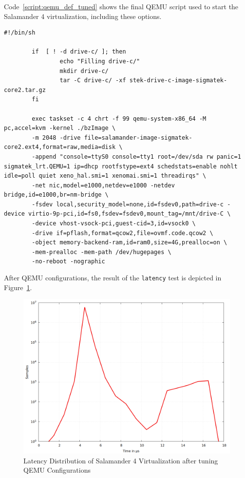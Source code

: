 \documentclass[MMR,Master,english]{twbook}
\begin{document}
\noindent Code~\ref{script:qemu_def_tuned} shows the final QEMU script used to start the Salamander 4 virtualization, including these options.

\clearpage

\begin{lstlisting}[name={Tuned QEMU Script for starting Salamander 4 Virtualization},label={script:qemu_def_tuned}]
		#!/bin/sh

		if  [ ! -d drive-c/ ]; then
				echo "Filling drive-c/"
				mkdir drive-c/
				tar -C drive-c/ -xf stek-drive-c-image-sigmatek-core2.tar.gz
		fi
			
		exec taskset -c 4 chrt -f 99 qemu-system-x86_64 -M pc,accel=kvm -kernel ./bzImage \
		-m 2048 -drive file=salamander-image-sigmatek-core2.ext4,format=raw,media=disk \
		-append "console=ttyS0 console=tty1 root=/dev/sda rw panic=1 sigmatek_lrt.QEMU=1 ip=dhcp rootfstype=ext4 schedstats=enable nohlt idle=poll quiet xeno_hal.smi=1 xenomai.smi=1 threadirqs" \
		-net nic,model=e1000,netdev=e1000 -netdev bridge,id=e1000,br=nm-bridge \
		-fsdev local,security_model=none,id=fsdev0,path=drive-c -device virtio-9p-pci,id=fs0,fsdev=fsdev0,mount_tag=/mnt/drive-C \
		-device vhost-vsock-pci,guest-cid=3,id=vsock0 \
		-drive if=pflash,format=qcow2,file=ovmf.code.qcow2 \
		-object memory-backend-ram,id=ram0,size=4G,prealloc=on \
		-mem-prealloc -mem-path /dev/hugepages \
		-no-reboot -nographic
	\end{lstlisting}
\vspace{2em}
\noindent After QEMU configurations, the result of the \texttt{latency} test is depicted in Figure~\ref{fig:max_latency_rt_kernelparam_host_qemu}.

\begin{figure}[H]
	\centering
	\includegraphics[width=0.7\columnwidth]{masterthesis-documentation/docs/sigmatek/xenomai/6rt_kernelparam_host_qemu/gnuplot_max_latency_rt_kernelparam_host_qemu.png}
	\caption[Latency Distribution of Salamander 4 after QEMU Configurations]{Latency Distribution of Salamander 4 Virtualization after tuning QEMU Configurations}
	\label{fig:max_latency_rt_kernelparam_host_qemu}
\end{figure}
\end{document}
